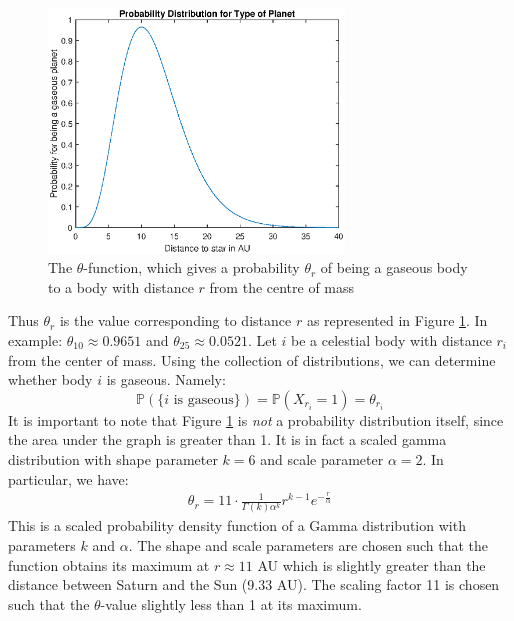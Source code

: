 \begin{figure}[H]
  \centering
  \includegraphics[width=0.7\textwidth]{probdistrgasplan}
  \caption{The \(\theta\)-function, which gives a probability \(\theta_r\) of being a gaseous body to a body with distance \(r\) from the centre of mass}
  \label{fig:probdist}
\end{figure}
Thus \(\theta_r\) is the value corresponding to distance \(r\) as represented in Figure \ref{fig:probdist}. In example: \(\theta_{10}\approx 0.9651\) and \(\theta_{25} \approx 0.0521\).
Let \(i\) be a celestial body with distance \(r_i\) from the center of mass. Using the collection of distributions, we can determine whether body \(i\) is gaseous. Namely:
\[\mathbb{P}(\{i\mbox{ is gaseous}\})= \mathbb{P}(X_{r_i}=1)=\theta_{r_i}\]
It is important to note that Figure \ref{fig:probdist} is \textit{not} a probability distribution itself, since the area under the graph is greater than 1. It is in fact a scaled gamma distribution with shape parameter \(k=6\) and scale parameter \(\alpha =2\).
In particular, we have:
\begin{align*}
	\theta_r=11\cdot\frac{1}{\Gamma(k)\alpha^k}r^{k-1}e^{-\frac{r}{\alpha}}
\end{align*}
This is a scaled probability density function of a Gamma distribution with parameters \(k\) and \(\alpha\). 
The shape and scale parameters are chosen such that the function obtains its maximum at \(r\approx 11\) AU which is slightly greater than the distance between Saturn and the Sun (9.33 AU). 
The scaling factor 11 is chosen such that the \(\theta\)-value slightly less than 1 at its maximum. 
